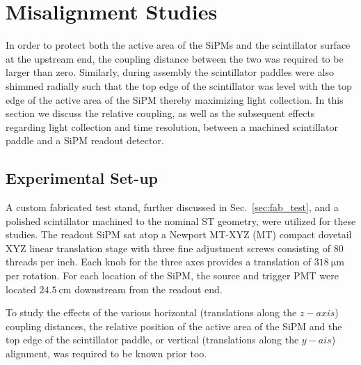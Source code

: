 \section{Misalignment Studies} \label{sec:misalign}

In order to protect both the active area of the SiPMs and the scintillator surface at the upstream end, the coupling distance between the two was required to be larger than zero.  Similarly, during assembly the scintillator paddles were also shimmed radially such that the top edge of the scintillator was level with the top edge of the active area of the SiPM thereby maximizing light collection.  In this section we discuss the relative coupling, as well as the subsequent effects regarding light collection and time resolution, between a machined scintillator paddle and a SiPM readout detector.

\subsection{Experimental Set-up} \label{sec:misalign_setup}

A custom fabricated test stand, further discussed in Sec.~\ref{sec:fab_test}, and a polished scintillator machined to the nominal ST geometry, were utilized for these studies.  The readout SiPM sat atop a Newport MT-XYZ (MT) compact dovetail XYZ linear translation stage\cite{newport_mt_xyz} with three fine adjustment screws consisting of 80 threads per inch.  Each knob for the three axes provides a translation of $318\ \mathrm{\mu m}$ per rotation.  For each location of the SiPM, the source and trigger PMT were located $\mathrm{24.5~cm}$ downstream from the readout end.

To study the effects of the various horizontal (translations along the $z-axis$) coupling distances, the relative position of the active area of the SiPM and the top edge of the scintillator paddle, or vertical (translations along the $y-ais$) alignment, was required to be known prior too.

